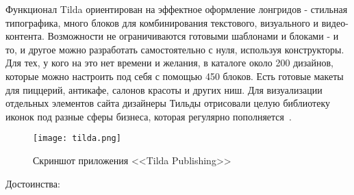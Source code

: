 Функционал Tilda ориентирован на эффектное оформление лонгридов - стильная типографика, много блоков для комбинирования текстового, визуального и видео-контента. Возможности не ограничиваются готовыми шаблонами и блоками - и то, и другое можно разработать самостоятельно с нуля, используя конструкторы. Для тех, у кого на это нет времени и желания, в каталоге около 200 дизайнов, которые можно настроить под себя с помощью 450 блоков. Есть готовые макеты для пиццерий, антикафе, салонов красоты и других ниш. Для визуализации отдельных элементов сайта дизайнеры Тильды отрисовали целую библиотеку иконок под разные сферы бизнеса, которая регулярно пополняется~\cite{cms_examples}.

\pagebreak

\begin{figure}
\centering
	\texttt{[image: tilda.png]}
	\caption{Скриншот приложения <<Tilda Publishing>>}
	\label{sec:analysis:tilda}
\end{figure}

Достоинства:

